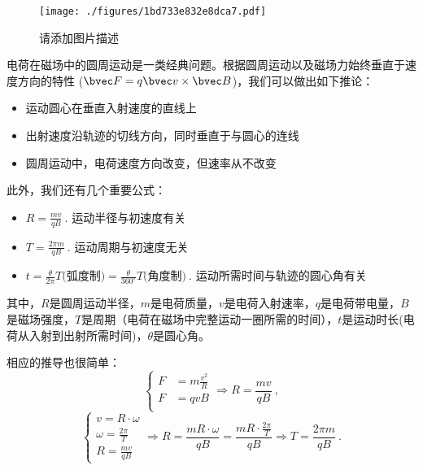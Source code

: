 

\begin{figure}[ht]
\centering
\texttt{[image: ./figures/1bd733e832e8dca7.pdf]}
\caption{请添加图片描述} \label{fig_CBM_1}
\end{figure}

电荷在磁场中的圆周运动是一类经典问题。根据圆周运动以及磁场力始终垂直于速度方向的特性 ($\bvec F = q\bvec v \times \bvec B$)，我们可以做出如下推论：
\begin{itemize}
\item 运动圆心在垂直入射速度的直线上
\item 出射速度沿轨迹的切线方向，同时垂直于与圆心的连线
\item 圆周运动中，电荷速度方向改变，但速率从不改变
\end{itemize}

此外，我们还有几个重要公式：
\begin{itemize}
\item $R=\frac{mv}{qB}~.$ 运动半径与初速度有关
\item $T=\frac{2\pi m}{qB}~.$ 运动周期与初速度无关
\item $t = \frac{\theta}{2\pi} T\text{(弧度制)}= \frac{\theta}{360^\circ } T\text{(角度制)}~.$ 运动所需时间与轨迹的圆心角有关
\end{itemize}
其中，$R$是圆周运动半径，$m$是电荷质量，$v$是电荷入射速率，$q$是电荷带电量，$B$是磁场强度，$T$是周期（电荷在磁场中完整运动一圈所需的时间），$t$是运动时长(电荷从入射到出射所需时间)，$\theta$是圆心角。

相应的推导也很简单：
$$
\left \{
\begin{aligned}
F&=m\frac{v^2}{R}\\
F&=qvB\\
\end{aligned}
\Rightarrow
R=\frac{mv}{qB}
\right.
~,
$$
$$
\left \{
\begin{aligned}
v=R\cdot\omega\\
\omega = \frac{2\pi}{T}\\
R=\frac{mv}{qB}
\end{aligned}
\Rightarrow
R=\frac{mR\cdot\omega}{qB}=\frac{mR\cdot\frac{2\pi}{T}}{qB}
\Rightarrow
T=\frac{2\pi m}{qB}
\right.
~.
$$
